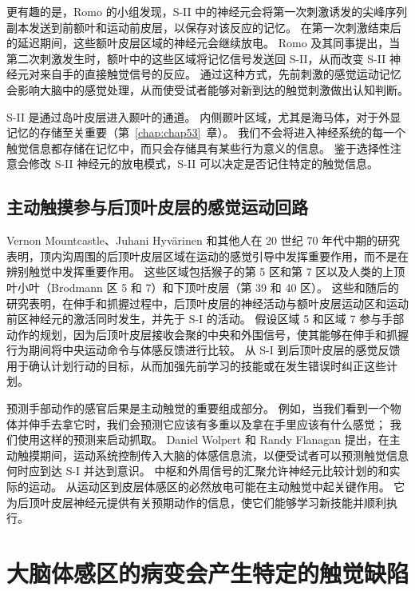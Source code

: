 更有趣的是，Romo 的小组发现，S-II 中的神经元会将第一次刺激诱发的尖峰序列副本发送到前额叶和运动前皮层，以保存对该反应的记忆。
在第一次刺激结束后的延迟期间，这些额叶皮层区域的神经元会继续放电。
Romo 及其同事提出，当第二次刺激发生时，额叶中的这些区域将记忆信号发送回 S-II，从而改变 S-II 神经元对来自手的直接触觉信号的反应。
通过这种方式，先前刺激的感觉运动记忆会影响大脑中的感觉处理，从而使受试者能够对新到达的触觉刺激做出认知判断。


S-II 是通过岛叶皮层进入颞叶的通道。
内侧颞叶区域，尤其是海马体，对于外显记忆的存储至关重要（第~\ref{chap:chap53}~章）。
我们不会将进入神经系统的每一个触觉信息都存储在记忆中，而只会存储具有某些行为意义的信息。
鉴于选择性注意会修改 S-II 神经元的放电模式，S-II 可以决定是否记住特定的触觉信息。



\subsection{主动触摸参与后顶叶皮层的感觉运动回路}

Vernon Mountcastle、Juhani Hyvärinen 和其他人在 20 世纪 70 年代中期的研究表明，顶内沟周围的后顶叶皮层区域在运动的感觉引导中发挥重要作用，而不是在辨别触觉中发挥重要作用。
这些区域包括猴子的第 5 区和第 7 区以及人类的上顶叶小叶（Brodmann 区 5 和 7）和下顶叶皮层（第 39 和 40 区）。
这些和随后的研究表明，在伸手和抓握过程中，后顶叶皮层的神经活动与额叶皮层运动区和运动前区神经元的激活同时发生，并先于 S-I 的活动。
假设区域 5 和区域 7 参与手部动作的规划，因为后顶叶皮层接收会聚的中央和外围信号，使其能够在伸手和抓握行为期间将中央运动命令与体感反馈进行比较。
从 S-I 到后顶叶皮层的感觉反馈用于确认计划行动的目标，从而加强先前学习的技能或在发生错误时纠正这些计划。


预测手部动作的感官后果是主动触觉的重要组成部分。
例如，当我们看到一个物体并伸手去拿它时，我们会预测它应该有多重以及拿在手里应该有什么感觉；
我们使用这样的预测来启动抓取。
Daniel Wolpert 和 Randy Flanagan 提出，在主动触摸期间，运动系统控制传入大脑的体感信息流，以便受试者可以预测触觉信息何时应到达 S-I 并达到意识。 
中枢和外周信号的汇聚允许神经元比较计划的和实际的运动。
从运动区到皮层体感区的必然放电可能在主动触觉中起关键作用。
它为后顶叶皮层神经元提供有关预期动作的信息，使它们能够学习新技能并顺利执行。



\section{大脑体感区的病变会产生特定的触觉缺陷}

